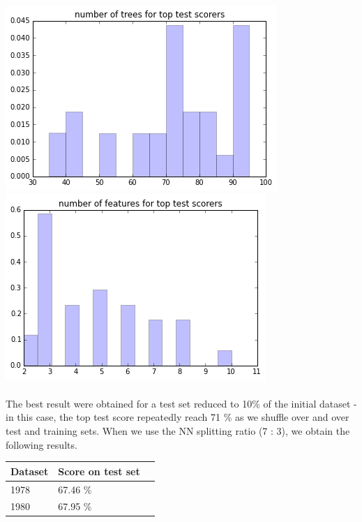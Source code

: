 \documentclass[a0,landscape]{a0poster}
\begin{document}
\begin{multicols}{4}
\begin{center}\vspace{1cm}
  \includegraphics[width=.45\linewidth]{number_forest78.png}
  \includegraphics[width=.45\linewidth]{number_features78.png}
\end{center}\vspace{1cm}

\paragraph{}
The best result were obtained for a test set reduced to 10\% of the initial dataset - in this case, the top test score repeatedly reach 71 \% as we shuffle over and over test and training sets. When we use the NN splitting ratio (7 : 3), we obtain the following results.

\begin{center}\vspace{1cm}
\begin{tabular}{l l l}
\toprule
\textbf{Dataset} & \textbf{Score on test set} \\
\midrule
1978 & 67.46 \%  \\
1980 & 67.95 \%  \\
\bottomrule
\end{tabular}
\end{center}\vspace{1cm}



\end{multicols}
\end{document}
